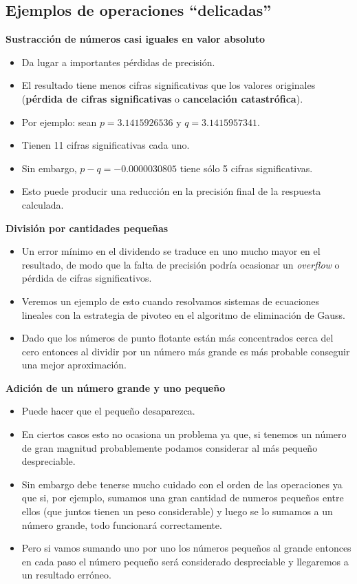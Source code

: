 \documentclass[openany]{book}
\providecommand{\tightlist}{%
  \setlength{\itemsep}{0pt}\setlength{\parskip}{0pt}}
\begin{document}
\hypertarget{ejemplos-de-operaciones-delicadas}{%
\subsection{Ejemplos de operaciones ``delicadas''}\label{ejemplos-de-operaciones-delicadas}}

\textbf{Sustracción de números casi iguales en valor absoluto}

\begin{itemize}
\tightlist
\item
  Da lugar a importantes pérdidas de precisión.
\item
  El resultado tiene menos cifras significativas que los valores originales (\textbf{pérdida de cifras significativas} o \textbf{cancelación catastrófica}).
\item
  Por ejemplo: sean \(p = 3.1415926536\) y \(q = 3.1415957341\).
\item
  Tienen 11 cifras significativas cada uno.
\item
  Sin embargo, \(p - q = -0.0000030805\) tiene sólo 5 cifras significativas.
\item
  Esto puede producir una reducción en la precisión final de la respuesta calculada.
\end{itemize}

\textbf{División por cantidades pequeñas}

\begin{itemize}
\tightlist
\item
  Un error mínimo en el dividendo se traduce en uno mucho mayor en el resultado, de modo que la falta de precisión podría ocasionar un \emph{overflow} o pérdida de cifras significativos.
\item
  Veremos un ejemplo de esto cuando resolvamos sistemas de ecuaciones lineales con la estrategia de pivoteo en el algoritmo de eliminación de Gauss.
\item
  Dado que los números de punto flotante están más concentrados cerca del cero entonces al dividir por un número más grande es más probable conseguir una mejor aproximación.
\end{itemize}

\textbf{Adición de un número grande y uno pequeño}

\begin{itemize}
\tightlist
\item
  Puede hacer que el pequeño desaparezca.
\item
  En ciertos casos esto no ocasiona un problema ya que, si tenemos un número de gran magnitud probablemente podamos considerar al más pequeño despreciable.
\item
  Sin embargo debe tenerse mucho cuidado con el orden de las operaciones ya que si, por ejemplo, sumamos una gran cantidad de numeros pequeños entre ellos (que juntos tienen un peso considerable) y luego se lo sumamos a un número grande, todo funcionará correctamente.
\item
  Pero si vamos sumando uno por uno los números pequeños al grande entonces en cada paso el número pequeño será considerado despreciable y llegaremos a un resultado erróneo.
\end{itemize}
\end{document}
